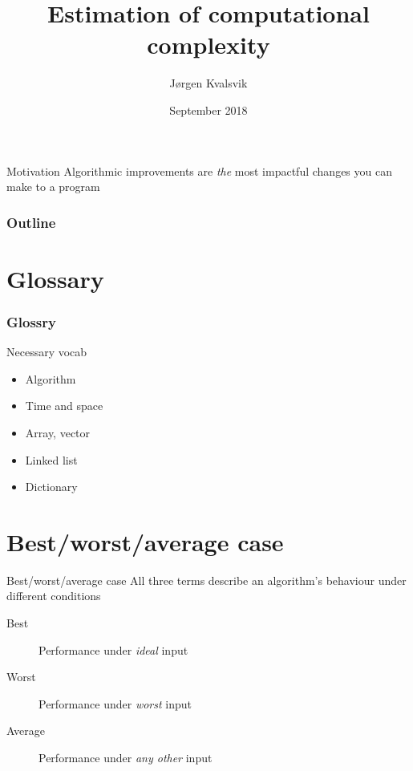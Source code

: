 \documentclass[pdf]{beamer}
\title{Estimation of computational complexity}
\author{Jørgen Kvalsvik}
\date{September 2018}
\begin{document}
\maketitle

\begin{frame}{Motivation}
    Algorithmic improvements are \emph{the} most impactful changes you can make
    to a program
\end{frame}

\begin{frame}
    \frametitle{Outline}
    \tableofcontents
\end{frame}

\section{Glossary}
\tableofcontents[currentsection]

\begin{frame}
\frametitle{Glossry}
    \begin{block}{Necessary vocab}
        \begin{itemize}
            \item Algorithm
            \item Time and space
            \item Array, vector
            \item Linked list
            \item Dictionary
        \end{itemize}
    \end{block}
\end{frame}

%
%
\section{Best/worst/average case}
\tableofcontents[currentsection]

\begin{frame}{Best/worst/average case}
    All three terms describe an algorithm's behaviour under different
    conditions
    \begin{description}
        \item [Best]    Performance under \emph{ideal} input
        \item [Worst]   Performance under \emph{worst} input
        \item [Average] Performance under \emph{any other} input
    \end{description}
\end{frame}
\end{document}
